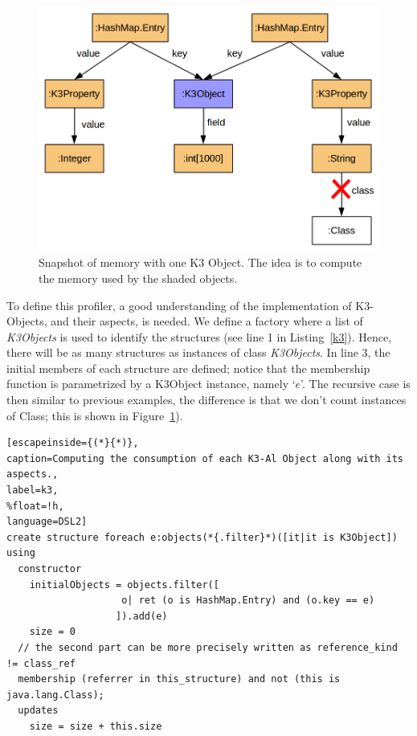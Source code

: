 \begin{figure}[!ht]
\centering
\includegraphics[scale=0.4]{./chapter6/fig/k3objects.png}
\caption{Snapshot of memory with one K3 Object. The idea is to compute the memory used by the shaded objects.} \label{fig:dsl-k3-example}
\end{figure}

To define this profiler, a good understanding of the implementation of K3-Objects, and their aspects, is needed.
We define a factory where a list of \textit{K3Objects} is used to identify the structures (see line 1 in Listing~\ref{k3}).
Hence, there will be as many structures as instances of class \textit{K3Objects}.
In line 3, the initial members of each structure are defined; notice that the membership function is parametrized by a K3Object instance, namely `$e$'.
The recursive case is then similar to previous examples, the difference is that we don't count instances of Class; this is shown in Figure~\ref{fig:dsl-k3-example}).


\begin{lstlisting}[escapeinside={(*}{*)},
caption=Computing the consumption of each K3-Al Object along with its aspects., 
label=k3,
%float=!h, 
language=DSL2]
create structure foreach e:objects(*{.filter}*)([it|it is K3Object]) using
  constructor
    initialObjects = objects.filter([
				    o| ret (o is HashMap.Entry) and (o.key == e)
				   ]).add(e)
    size = 0
  // the second part can be more precisely written as reference_kind != class_ref
  membership (referrer in this_structure) and not (this is java.lang.Class);
  updates
    size = size + this.size
\end{lstlisting}